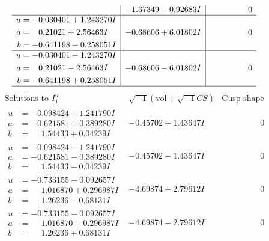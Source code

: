\documentclass[1p]{elsarticle_modified}
\theoremstyle{definition}
\newcommand{\I}{\sqrt{-1}}
\begin{document}
$$\begin{array}{c|c|c}
 & -1.37349 - 0.92683 I & \phantom{-0.000000 } 0 \\ \hline\begin{aligned}
u &= -0.030401 + 1.243270 I \\
a &= \phantom{-}0.21021 + 2.56463 I \\
b &= -0.641198 - 0.258051 I\end{aligned}
 & -0.68606 + 6.01802 I & \phantom{-0.000000 } 0 \\ \hline\begin{aligned}
u &= -0.030401 - 1.243270 I \\
a &= \phantom{-}0.21021 - 2.56463 I \\
b &= -0.641198 + 0.258051 I\end{aligned}
 & -0.68606 - 6.01802 I & \phantom{-0.000000 } 0\\
 \hline 
 \end{array}$$\newpage$$\begin{array}{c|c|c}  
\text{Solutions to }I^u_{1}& \I (\text{vol} + \sqrt{-1}CS) & \text{Cusp shape}\\
 \hline 
\begin{aligned}
u &= -0.098424 + 1.241790 I \\
a &= -0.621581 + 0.389280 I \\
b &= \phantom{-}1.54433 + 0.04239 I\end{aligned}
 & -0.45702 + 1.43647 I & \phantom{-0.000000 } 0 \\ \hline\begin{aligned}
u &= -0.098424 - 1.241790 I \\
a &= -0.621581 - 0.389280 I \\
b &= \phantom{-}1.54433 - 0.04239 I\end{aligned}
 & -0.45702 - 1.43647 I & \phantom{-0.000000 } 0 \\ \hline\begin{aligned}
u &= -0.733155 + 0.092657 I \\
a &= \phantom{-}1.016870 + 0.296987 I \\
b &= \phantom{-}1.26236 - 0.68131 I\end{aligned}
 & -4.69874 + 2.79612 I & \phantom{-0.000000 } 0 \\ \hline\begin{aligned}
u &= -0.733155 - 0.092657 I \\
a &= \phantom{-}1.016870 - 0.296987 I \\
b &= \phantom{-}1.26236 + 0.68131 I\end{aligned}
 & -4.69874 - 2.79612 I & \phantom{-0.000000 } 0 \\ \hline\begin{aligned}

\end{aligned}
\end{array}$$
\end{document}
